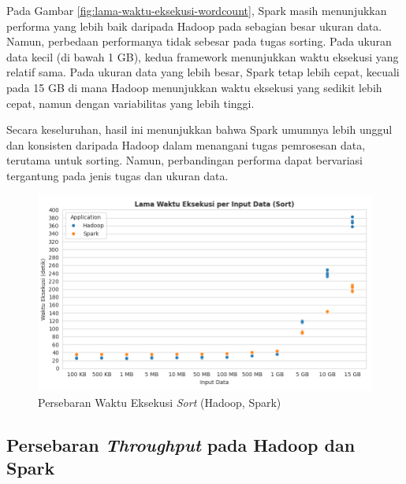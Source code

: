 Pada Gambar \ref{fig:lama-waktu-eksekusi-wordcount}, Spark masih menunjukkan performa yang lebih baik daripada Hadoop pada sebagian besar ukuran data. Namun, perbedaan performanya tidak sebesar pada tugas sorting. Pada ukuran data kecil (di bawah 1 GB), kedua framework menunjukkan waktu eksekusi yang relatif sama. Pada ukuran data yang lebih besar, Spark tetap lebih cepat, kecuali pada 15 GB di mana Hadoop menunjukkan waktu eksekusi yang sedikit lebih cepat, namun dengan variabilitas yang lebih tinggi. 

Secara keseluruhan, hasil ini menunjukkan bahwa Spark umumnya lebih unggul dan konsisten daripada Hadoop dalam menangani tugas pemrosesan data, terutama untuk sorting. Namun, perbandingan performa dapat bervariasi tergantung pada jenis tugas dan ukuran data.

\begin{figure}[h]
    \centering
    \includegraphics[width=1\textwidth]{figures/ch04/1-lama-waktu-eksekusi-sort.png}
    \caption{Persebaran Waktu Eksekusi \textit{Sort} (Hadoop, Spark)}
    \label{fig:lama-waktu-eksekusi-sort}
\end{figure}

\subsection {Persebaran \textit{Throughput} pada Hadoop dan Spark}

